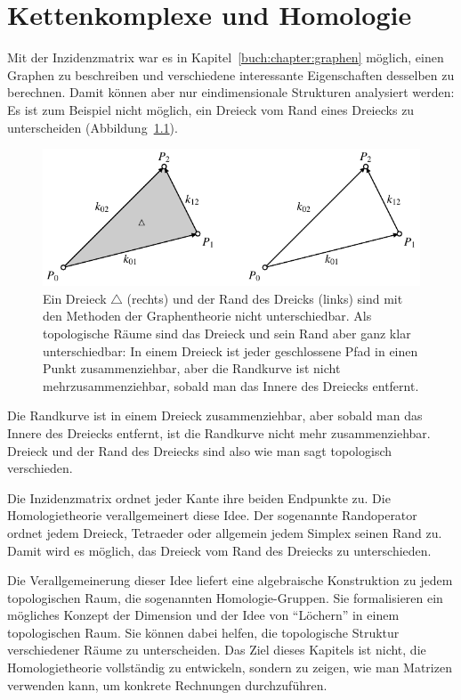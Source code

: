 %
%
%
\chapter{Kettenkomplexe und Homologie
\label{buch:chapter:homologie}}
\rhead{}
Mit der Inzidenzmatrix war es in Kapitel~\ref{buch:chapter:graphen}
möglich, einen Graphen zu beschreiben
und verschiedene interessante Eigenschaften desselben zu berechnen.
Damit können aber nur eindimensionale Strukturen analysiert werden:
Es ist zum Beispiel nicht möglich, ein Dreieck vom Rand eines
Dreiecks zu unterscheiden
(Abbildung~\ref{buch:homologie:figure:zusammenziehbar}).
\begin{figure}
\centering
\includegraphics{chapters/95-homologie/images/dreieck.pdf}
\caption{Ein Dreieck $\triangle$ (rechts) und der Rand des Dreicks
(links) sind mit den Methoden
der Graphentheorie nicht unterschiedbar. 
Als topologische Räume sind das Dreieck und sein Rand aber ganz klar
unterschiedbar: In einem Dreieck ist jeder geschlossene Pfad in einen 
Punkt zusammenziehbar, aber die Randkurve ist nicht mehrzusammenziehbar,
sobald man das Innere des Dreiecks entfernt.
\label{buch:homologie:figure:zusammenziehbar}}
\end{figure}
Die Randkurve ist in einem Dreieck zusammenziehbar, aber sobald man
das Innere des Dreiecks entfernt, ist die Randkurve nicht mehr
zusammenziehbar.
Dreieck und der Rand des Dreiecks sind also wie man sagt topologisch verschieden.

Die Inzidenzmatrix ordnet jeder Kante ihre beiden Endpunkte zu.
Die Homologietheorie verallgemeinert diese Idee.
Der sogenannte Randoperator ordnet jedem Dreieck, Tetraeder oder allgemein
jedem Simplex seinen Rand zu.
Damit wird es möglich, das Dreieck vom Rand des Dreiecks zu unterschieden.

Die Verallgemeinerung dieser Idee liefert eine algebraische Konstruktion
zu jedem topologischen Raum, die sogenannten Homologie-Gruppen.
Sie formalisieren ein mögliches Konzept der Dimension und der
Idee von ``Löchern'' in einem topologischen Raum.
Sie können dabei helfen, die topologische Struktur verschiedener
Räume zu unterscheiden.
Das Ziel dieses Kapitels ist nicht, die Homologietheorie 
vollständig zu entwickeln, sondern zu zeigen, wie man Matrizen
verwenden kann, um konkrete Rechnungen durchzuführen.




%








